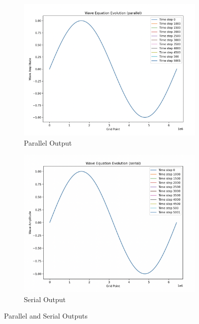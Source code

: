 \documentclass[a4paper,10pt]{article}
\begin{document}
\begin{figure}[h]
     \centering
     \begin{subfigure}[b]{0.45\textwidth}
        \centering
        \includegraphics[width=\linewidth]{img/ex1/wave_vis_parallel.png}
        \caption{Parallel Output}
        \label{fig:ex1_parallel_output}
     \end{subfigure}
     \hfill
     \begin{subfigure}[b]{0.45\textwidth}
        \centering
        \includegraphics[width=\linewidth]{img/ex1/wave_vis_serial.png}
        \caption{Serial Output}
        \label{fig:ex1_serial_output}
     \end{subfigure}
  \caption{Parallel and Serial Outputs}
\end{figure}
\end{document}
